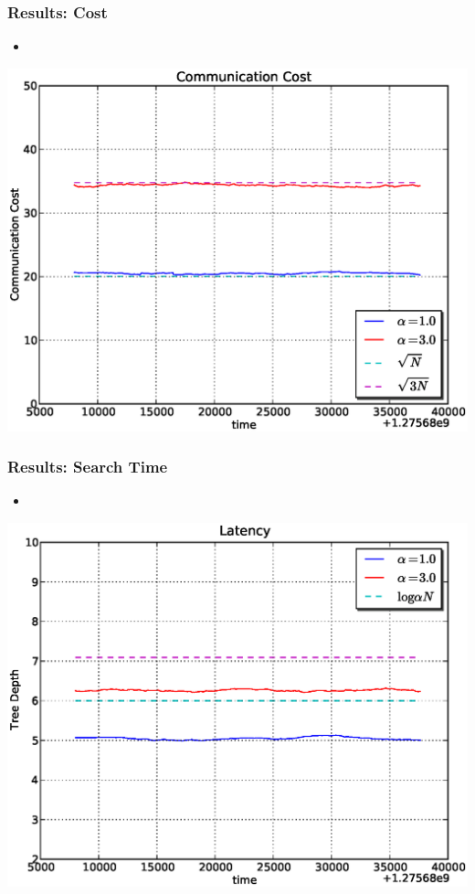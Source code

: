 \documentclass[red]{beamer}
\begin{document}
\begin{frame}
\frametitle{Results: Cost}
\begin{itemize}
\item 
\end{itemize}
\begin{center}
\includegraphics[scale=0.4]{figs/plab_cost.eps}
\end{center}
\end{frame}

\begin{frame}
\frametitle{Results: Search Time}
\begin{itemize}
\item 
\end{itemize}
\begin{center}
\includegraphics[scale=0.4]{figs/plab_depth.eps}
\end{center}
\end{frame}
\end{document}
